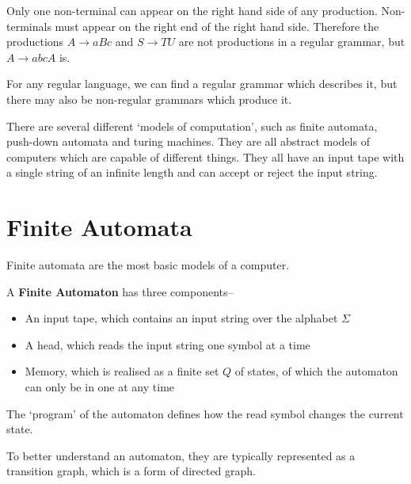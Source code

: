 Only one non-terminal can appear on the right hand side of any production. Non-terminals must appear on the right end
 of the right hand side. Therefore the productions $A \rightarrow aBc$ and $S \rightarrow TU$ are not productions in a
 regular grammar, but $A \rightarrow abcA$ is.

For any regular language, we can find a regular grammar which describes it, but there may also be non-regular grammars
 which produce it.




There are several different `models of computation', such as finite automata, push-down automata and turing machines.
 They are all abstract models of computers which are capable of different things. They all have an input tape with a
 single string of an infinite length and can accept or reject the input string.

\section*{Finite Automata}

Finite automata are the most basic models of a computer.

\begin{definition*}{}{}
  A \textbf{Finite Automaton} has three components--
  \begin{itemize}
    \item An input tape, which contains an input string over the alphabet $\Sigma$
    \item A head, which reads the input string one symbol at a time
    \item Memory, which is realised as a finite set $Q$ of states, of which the automaton can only be in one at any time
  \end{itemize}

  The `program' of the automaton defines how the read symbol changes the current state.
\end{definition*}

To better understand an automaton, they are typically represented as a transition graph, which is a form of directed
 graph.

